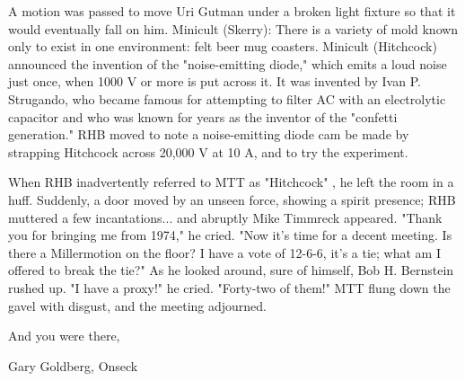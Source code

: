 \documentclass[12pt]{article}
\begin{document}
A motion was passed to move Uri Gutman under a broken light fixture so that it would eventually fall on him. Minicult (Skerry): There is a variety of mold known only to exist in one environment: felt beer mug coasters. Minicult (Hitchcock) announced the invention of the "noise-emitting diode," which emits a loud noise just once, when 1000 V or more is put across it. It was invented by Ivan P. Strugando, who became famous for attempting to filter AC with an electrolytic capacitor and who was known for years as the inventor of the "confetti generation." RHB moved to note a noise-emitting diode cam be made by strapping Hitchcock across 20,000 V at 10 A, and to try the experiment.

When RHB inadvertently referred to MTT as "Hitchcock" , he left the room in a huff. Suddenly, a door moved by an unseen force, showing a spirit presence; RHB muttered a few incantations... and abruptly Mike Timmreck appeared. "Thank you for bringing me from 1974," he cried. "Now it's time for a decent meeting. Is there a Millermotion on the floor? I have a vote of 12-6-6, it's a tie; what am I offered to break the tie?" As he looked around, sure of himself, Bob H. Bernstein rushed up. "I have a proxy!" he cried. "Forty-two of them!" MTT flung down the gavel with disgust, and the meeting adjourned.

\vspace{12pt}

\centerline{And you were there,}
\centerline{Gary Goldberg, Onseck}
\end{document}
